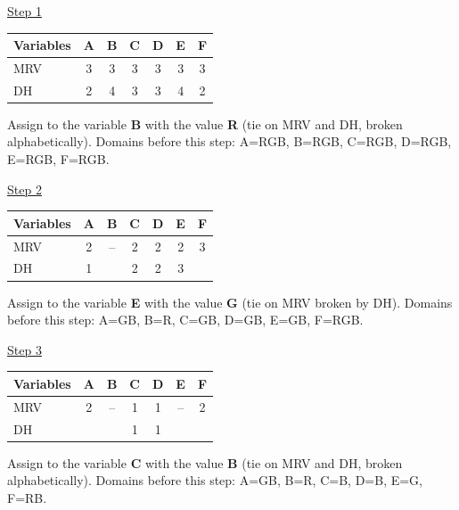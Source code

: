 \documentclass[11pt,a4paper]{article}
\begin{document}
\begin{solbox}
\par \underline{Step 1}\par\begin{center}\small \begin{tabular}{|l|c|c|c|c|c|c|}\hline Variables & \textbf{A} & \textbf{B} & \textbf{C} & \textbf{D} & \textbf{E} & \textbf{F}\\ \hline MRV & \textcolor{blue!60!black}{3} & \textcolor{blue!60!black}{3} & \textcolor{blue!60!black}{3} & \textcolor{blue!60!black}{3} & \textcolor{blue!60!black}{3} & \textcolor{blue!60!black}{3}\\ \hline DH & \textcolor{blue!60!black}{2} & \textcolor{blue!60!black}{4} & \textcolor{blue!60!black}{3} & \textcolor{blue!60!black}{3} & \textcolor{blue!60!black}{4} & \textcolor{blue!60!black}{2}\\ \hline\end{tabular}\end{center}Assign to the variable \textbf{B} with the value \textbf{R} (tie on MRV and DH, broken alphabetically). Domains before this step: A=RGB, B=RGB, C=RGB, D=RGB, E=RGB, F=RGB.\par
\underline{Step 2}\par\begin{center}\small \begin{tabular}{|l|c|c|c|c|c|c|}\hline Variables & \textbf{A} & \textbf{B} & \textbf{C} & \textbf{D} & \textbf{E} & \textbf{F}\\ \hline MRV & \textcolor{blue!60!black}{2} & -- & \textcolor{blue!60!black}{2} & \textcolor{blue!60!black}{2} & \textcolor{blue!60!black}{2} & \textcolor{blue!60!black}{3}\\ \hline DH & \textcolor{blue!60!black}{1} &  & \textcolor{blue!60!black}{2} & \textcolor{blue!60!black}{2} & \textcolor{blue!60!black}{3} & \\ \hline\end{tabular}\end{center}Assign to the variable \textbf{E} with the value \textbf{G} (tie on MRV broken by DH). Domains before this step: A=GB, B=R, C=GB, D=GB, E=GB, F=RGB.\par
\underline{Step 3}\par\begin{center}\small \begin{tabular}{|l|c|c|c|c|c|c|}\hline Variables & \textbf{A} & \textbf{B} & \textbf{C} & \textbf{D} & \textbf{E} & \textbf{F}\\ \hline MRV & \textcolor{blue!60!black}{2} & -- & \textcolor{blue!60!black}{1} & \textcolor{blue!60!black}{1} & -- & \textcolor{blue!60!black}{2}\\ \hline DH &  &  & \textcolor{blue!60!black}{1} & \textcolor{blue!60!black}{1} &  & \\ \hline\end{tabular}\end{center}Assign to the variable \textbf{C} with the value \textbf{B} (tie on MRV and DH, broken alphabetically). Domains before this step: A=GB, B=R, C=B, D=B, E=G, F=RB.\par

\end{solbox}
\end{document}
